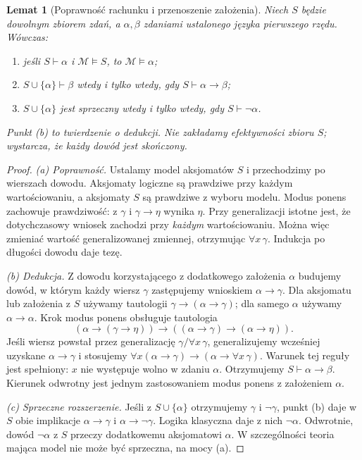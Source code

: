 \documentclass[11pt,a4paper]{article}
\numberwithin{equation}{section}
\theoremstyle{plain}
\newtheorem{lemat}[twierdzenie]{Lemat}
\theoremstyle{definition}
\theoremstyle{remark}
\begin{document}
\begin{lemat}[Poprawność rachunku i przenoszenie założenia]\label{res:3:6}
Niech $S$ będzie dowolnym zbiorem zdań, a $\alpha,\beta$ zdaniami ustalonego języka pierwszego rzędu. Wówczas:
\begin{enumerate}[label=(\alph*)]
\item jeśli $S\vdash\alpha$ i $\mathcal M\models S$, to $\mathcal M\models\alpha$;
\item $S\cup\{\alpha\}\vdash\beta$ wtedy i tylko wtedy, gdy $S\vdash\alpha\to\beta$;
\item $S\cup\{\alpha\}$ jest sprzeczny wtedy i tylko wtedy, gdy $S\vdash\neg\alpha$.
\end{enumerate}
Punkt (b) to \emph{twierdzenie o dedukcji}. Nie zakładamy efektywności zbioru $S$; wystarcza, że każdy dowód jest skończony.
\end{lemat}

\begin{proof}
\emph{(a) Poprawność.} Ustalamy model aksjomatów $S$ i przechodzimy po wierszach dowodu. Aksjomaty logiczne są prawdziwe przy każdym wartościowaniu, a aksjomaty $S$ są prawdziwe z wyboru modelu. Modus ponens zachowuje prawdziwość: z $\gamma$ i $\gamma\to\eta$ wynika $\eta$. Przy generalizacji istotne jest, że dotychczasowy wniosek zachodzi przy \emph{każdym} wartościowaniu. Można więc zmieniać wartość generalizowanej zmiennej, otrzymując $\forall x\,\gamma$. Indukcja po długości dowodu daje tezę.

\emph{(b) Dedukcja.} Z dowodu korzystającego z dodatkowego założenia $\alpha$ budujemy dowód, w którym każdy wiersz $\gamma$ zastępujemy wnioskiem $\alpha\to\gamma$. Dla aksjomatu lub założenia z $S$ używamy tautologii $\gamma\to(\alpha\to\gamma)$; dla samego $\alpha$ używamy $\alpha\to\alpha$. Krok modus ponens obsługuje tautologia
\[
(\alpha\to(\gamma\to\eta))\to((\alpha\to\gamma)\to(\alpha\to\eta)).
\]
Jeśli wiersz powstał przez generalizację $\gamma/\forall x\,\gamma$, generalizujemy wcześniej uzyskane $\alpha\to\gamma$ i stosujemy $\forall x(\alpha\to\gamma)\to(\alpha\to\forall x\,\gamma)$. Warunek tej reguły jest spełniony: $x$ nie występuje wolno w zdaniu $\alpha$. Otrzymujemy $S\vdash\alpha\to\beta$. Kierunek odwrotny jest jednym zastosowaniem modus ponens z założeniem $\alpha$.

\emph{(c) Sprzeczne rozszerzenie.} Jeśli z $S\cup\{\alpha\}$ otrzymujemy $\gamma$ i $\neg\gamma$, punkt (b) daje w $S$ obie implikacje $\alpha\to\gamma$ i $\alpha\to\neg\gamma$. Logika klasyczna daje z nich $\neg\alpha$. Odwrotnie, dowód $\neg\alpha$ z $S$ przeczy dodatkowemu aksjomatowi $\alpha$. W szczególności teoria mająca model nie może być sprzeczna, na mocy (a).
\end{proof}
\end{document}

